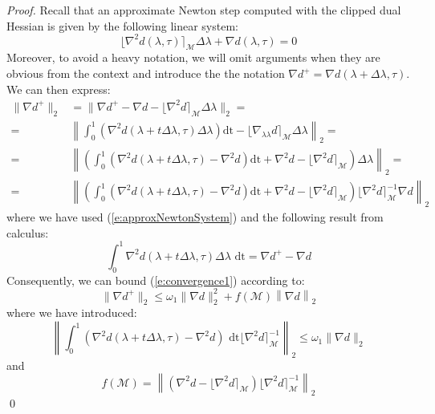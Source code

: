 \begin{proof}
Recall that an approximate Newton step computed with the clipped dual Hessian is given by the following linear system:
\begin{equation} \label{e:approxNewtonSystem}
\lfloor \nabla^2 d(\lambda,\tau) \rceil_{\mathcal{M}} \Delta \lambda  + \nabla d(\lambda,\tau) = 0
\end{equation}
Moreover, to avoid a heavy notation, we will omit arguments when they are obvious from the context and introduce the the notation $\nabla d^+ = \nabla d(\lambda + \Delta \lambda, \tau)$. We can then express:
\begin{equation}
\begin{aligned} \label{e:convergence1}
\| \nabla d^+ \|_2 & = \| \nabla d^+ - \nabla d - \lfloor \nabla^2 d \rceil_{\mathcal{M}} \Delta \lambda \|_2 = \\
= & \left\| \int_0^1 ( \nabla^2 d(\lambda + t \Delta \lambda, \tau) \Delta \lambda ) \text{dt} -  \lfloor \nabla_{\lambda\lambda} d \rceil_{\mathcal{M}} \Delta \lambda \right\|_2 = \\
= & \left\| \left( \int_0^1 ( \nabla^2 d(\lambda + t \Delta \lambda, \tau) - \nabla^2 d ) \text{dt} + \nabla^2 d -  \lfloor \nabla^2 d \rceil_{\mathcal{M}}  \right) \Delta \lambda \right\|_2 = \\
= & \left\| \left( \int_0^1 ( \nabla^2 d(\lambda + t \Delta \lambda, \tau) - \nabla^2 d ) \text{dt} + \nabla^2 d -  \lfloor \nabla^2 d \rceil_{\mathcal{M}}  \right)  \lfloor \nabla^2 d \rceil_{\mathcal{M}}^{-1} \nabla d \right\|_2 
\end{aligned}
\end{equation}
where we have used (\ref{e:approxNewtonSystem}) and the following result from calculus:
\begin{equation}
\int_0^1 \nabla^2 d(\lambda + t \Delta \lambda, \tau)\Delta \lambda \text{ dt} = \nabla d^+ - \nabla d
\end{equation}
Consequently, we can bound (\ref{e:convergence1}) according to:
\begin{equation}
\| \nabla d^+ \|_2 \leq \omega_1 \| \nabla d \|_2^2 + f(\mathcal{M}) \left\| \nabla d \right\|_2 
\end{equation}
where we have introduced:
\begin{equation}
\left\| \int_0^1 ( \nabla^2 d(\lambda + t \Delta \lambda, \tau) - \nabla^2 d ) \text{ dt} \lfloor \nabla^2 d \rceil_{\mathcal{M}}^{-1} \right\|_2 \leq \omega_1 \| \nabla d \|_2
\end{equation}
and
\begin{equation}
f(\mathcal{M}) = \left\| \left( \nabla^2 d -  \lfloor \nabla^2 d \rceil_{\mathcal{M}} \right)  \lfloor \nabla^2 d \rceil_{\mathcal{M}}^{-1} \right\|_2
\end{equation}
\qed
\end{proof}
